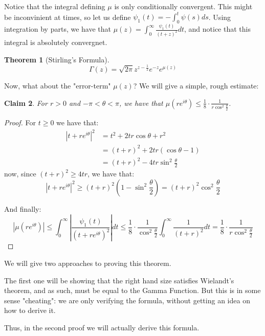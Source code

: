 \documentclass[11pt]{article} %
\newtheorem{theorem}{Theorem}[section]
\newtheorem{claim}[theorem]{Claim}
\theoremstyle{definition}
\theoremstyle{remark}
\newcommand{\abs}[1]{\left|#1\right|}
\begin{document}
Notice that the integral defining $\mu$ is only conditionally convergent. This might be inconvinient at times, so let us define $\psi_1\left(t\right) = -\int_0^t \psi\left(s\right) ds$. Using integration by parts, we have that $\mu\left(z\right) = \int_0^\infty \frac{\psi_1\left(t\right)}{\left(t+z\right)^2}dt$, and notice that this integral is absolutely convergnet.

\begin{theorem}[Stirling's Formula]
\[ \Gamma\left(z\right) = \sqrt{2\pi}z^{z-\frac{1}{2}}e^{-z}e^{\mu\left(z\right)} \]    
\end{theorem}

Now, what about the "error-term" $\mu\left(z\right)$? We will give a simple, rough estimate:

\begin{claim}
For $r > 0$ and $-\pi < \theta < \pi$, we have that $\mu\left(re^{i\theta}\right) \leq \frac{1}{8}\cdot\frac{1}{r\cos^2\frac{\theta}{2}}$.
\end{claim}

\begin{proof}
For $t \geq 0$ we have that:
\[
\begin{split}
\abs{t + re^{i\theta}}^2 & = t^2 + 2tr\cos\theta+r^2 \\
& = \left(t + r\right)^2 + 2tr \left(\cos\theta - 1\right) \\
& = \left(t + r\right)^2 - 4tr\sin^2 \frac{\theta}{2}
\end{split}
\]
now, since $\left(t+r\right)^2 \geq 4tr$, we have that:
\[ \abs{t + re^{i\theta}}^2 \geq \left(t+r\right)^2\left(1-\sin^2\frac{\theta}{2}\right) = \left(t+r\right)^2\cos^2\frac{\theta}{2} \]

And finally:
\[ \abs{\mu\left(re^{i\theta}\right)} \leq \int_0^\infty \abs{\frac{\psi_1\left(t\right)}{\left(t+re^{i\theta}\right)^2}}dt \leq \frac{1}{8} \cdot \frac{1}{\cos^2\frac{\theta}{2}}\int_0^\infty\frac{1}{\left(t+r\right)^2}dt = \frac{1}{8}\cdot\frac{1}{r\cos^2\frac{\theta}{2}}\]
\end{proof}

We will give two approaches to proving this theorem.

The first one will be showing that the right hand size satisfies Wielandt's theorem, and as such, must be equal to the Gamma Function. But this is in some sense "cheating": we are only verifying the formula, without getting an idea on how to derive it.

Thus, in the second proof we will actually derive this formula. 
\end{document}
